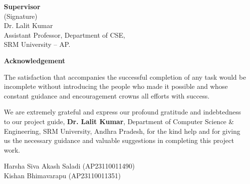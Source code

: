 \documentclass[12pt,a4paper,oneside]{report}
\begin{document}
\vspace{3cm}
\noindent\textbf{Supervisor}\\[1cm]
(Signature)\\
Dr. Lalit Kumar\\
Assistant Professor, Department of CSE,\\
SRM University -- AP.
\newpage

\begin{center}{\fontsize{18}{22}\selectfont\bfseries Acknowledgement}\end{center}
\vspace{0.5cm}

The satisfaction that accompanies the successful completion of any task would be incomplete without introducing the people who made it possible and whose constant guidance and encouragement crowns all efforts with success.

We are extremely grateful and express our profound gratitude and indebtedness to our project guide, \textbf{Dr. Lalit Kumar}, Department of Computer Science \& Engineering, SRM University, Andhra Pradesh, for the kind help and for giving us the necessary guidance and valuable suggestions in completing this project work.

\vspace{2cm}
\begin{center}
Harsha Siva Akash Saladi (AP23110011490)\\
Kishan Bhimavarapu (AP23110011351)
\end{center}
\newpage
\tableofcontents
\newpage
\end{document}
